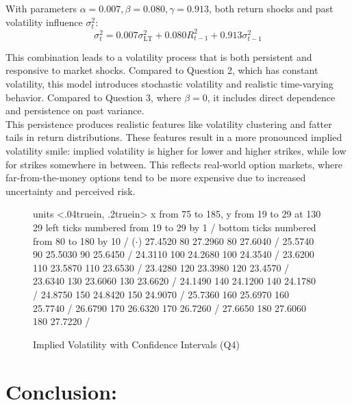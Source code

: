 \documentclass{report}
\begin{document}
With parameters \( \alpha = 0.007, \beta = 0.080, \gamma = 0.913 \), both return shocks and past volatility influence \( \sigma_t^2 \):
\[ \sigma_t^2 = 0.007\sigma_{\text{LT}}^2 + 0.080 R_{t-1}^2 + 0.913 \sigma_{t-1}^2 \]

This combination leads to a volatility process that is both persistent and responsive to market shocks. Compared to Question 2, which has constant volatility, this model introduces stochastic volatility and realistic time-varying behavior. Compared to Question 3, where \( \beta = 0 \), it includes direct dependence and persistence on past variance. \\

This persistence produces realistic features like volatility clustering and fatter tails in return distributions. These features result in a more pronounced implied volatility smile: implied volatility is higher for lower and higher strikes, while low for strikes somewhere in between. This reflects real-world option markets, where far-from-the-money options tend to be more expensive due to increased uncertainty and perceived risk.





\begin{figure}[h!]
\centering
\beginpicture
\setcoordinatesystem units <.04truein, .2truein> 
\setplotarea x from 75 to 185, y from  19 to 29
 at 130 29
\axis left ticks numbered from 19 to 29 by 1 /
\axis bottom ticks numbered from 80 to 180 by 10 /
\setplotsymbol ({$\cdot$})
 27.4520 80 27.2960 80 27.6040 /
 25.5740 90 25.5030 90 25.6450 /
 24.3110 100 24.2680 100 24.3540 /
 23.6200 110 23.5870 110 23.6530 /
 23.4280 120 23.3980 120 23.4570 /
 23.6340 130 23.6060 130 23.6620 /
 24.1490 140 24.1200 140 24.1780 /
 24.8750 150 24.8420 150 24.9070 /
 25.7360 160 25.6970 160 25.7740 /
 26.6790 170 26.6320 170 26.7260 /
 27.6650 180 27.6060 180 27.7220 /
\endpicture
\caption{Implied Volatility with Confidence Intervals (Q4)}
\end{figure}



\newpage










\section*{Conclusion:}
\end{document}
